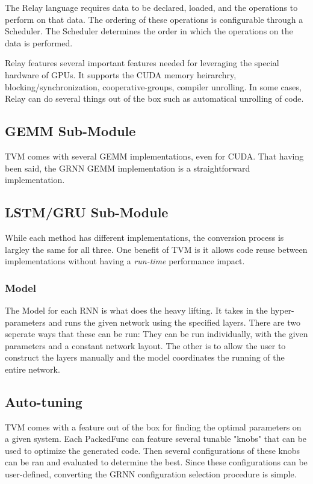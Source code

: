 \documentclass{scrreprt}
\begin{document}
The Relay language requires data to be declared, loaded, and the operations to perform on that data. The ordering of
these operations is configurable through a Scheduler. The Scheduler determines the order in which the operations on the
data is performed.

Relay features several important features needed for leveraging the special hardware of GPUs. It supports the CUDA
memory heirarchry, blocking/synchronization, cooperative-groups, compiler unrolling. In some cases, Relay can do
several things out of the box such as automatical unrolling of code.

\subsection{GEMM Sub-Module}
TVM comes with several GEMM implementations, even for CUDA. That having been said, the GRNN GEMM implementation is a
straightforward implementation.

\subsection{LSTM/GRU Sub-Module}
While each method has different implementations, the conversion process is largley the same for all three. One benefit
of TVM is it allows code reuse between implementations without having a \emph{run-time} performance impact.

\subsubsection{Model}
The Model for each RNN is what does the heavy lifting. It takes in the hyper-parameters and runs the given network
using the specified layers. There are two seperate ways that these can be run: They can be run individually, with the
given parameters and a constant network layout. The other is to allow the user to construct the layers manually and
the model coordinates the running of the entire network.

\subsection{Auto-tuning}
TVM comes with a feature out of the box for finding the optimal parameters on a given system. Each PackedFunc can feature
several tunable "knobs" that can be used to optimize the generated code. Then several configurations of these knobs can
be ran and evaluated to determine the best. Since these configurations can be user-defined, converting the GRNN
configuration selection procedure is simple.
\end{document}
